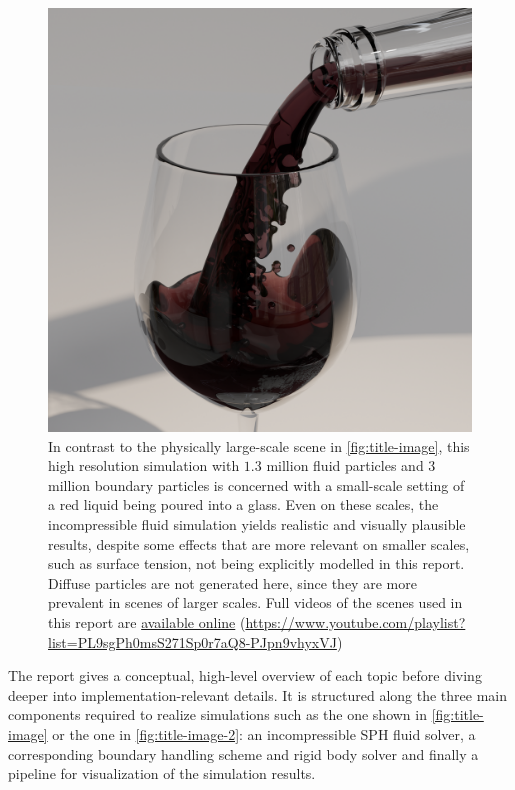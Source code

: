 \documentclass[oneside, a4paper]{book}
\begin{document}
\begin{figure}
  \centering
  \includegraphics[width=\textwidth]{images/wine-240-far-smoothed.png}
  \caption{In contrast to the physically large-scale scene in \autoref{fig:title-image}, this high resolution simulation with $1.3$ million fluid particles and $3$ million boundary particles is concerned with a small-scale setting of a red liquid being poured into a glass. Even on these scales, the incompressible fluid simulation yields realistic and visually plausible results, despite some effects that are more relevant on smaller scales, such as surface tension, not being explicitly modelled in this report. Diffuse particles are not generated here, since they are more prevalent in scenes of larger scales.
  Full videos of the scenes used in this report are \href{https://www.youtube.com/playlist?list=PL9sgPh0msS271Sp0r7aQ8-PJpn9vhyxVJ}{available online} (\url{https://www.youtube.com/playlist?list=PL9sgPh0msS271Sp0r7aQ8-PJpn9vhyxVJ})}
  \label{fig:title-image-2}
\end{figure}

The report gives a conceptual, high-level overview of each topic before diving deeper into implementation-relevant details. It is structured along the three main components required to realize simulations such as the one shown in \autoref{fig:title-image} or the one in \autoref{fig:title-image-2}: an incompressible SPH fluid solver, a corresponding boundary handling scheme and rigid body solver and finally a pipeline for visualization of the simulation results. 
\end{document}
